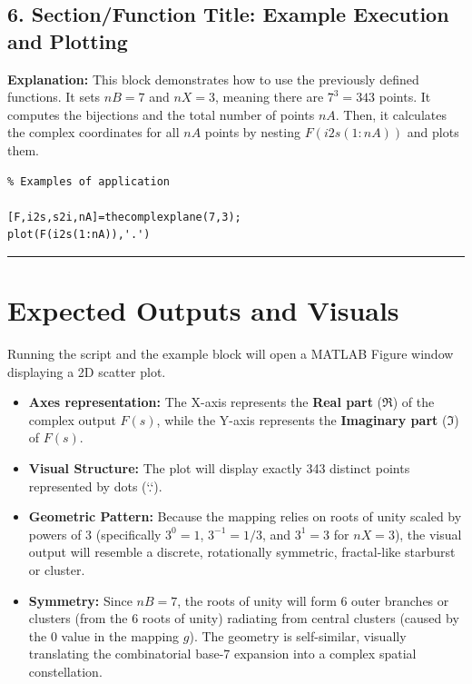 \subsection{6. Section/Function Title: Example Execution and Plotting}
\textbf{Explanation:} This block demonstrates how to use the previously defined functions. It sets $nB = 7$ and $nX = 3$, meaning there are $7^3 = 343$ points. It computes the bijections and the total number of points $nA$. Then, it calculates the complex coordinates for all $nA$ points by nesting $F(i2s(1:nA))$ and plots them.
\begin{lstlisting}
% Examples of application

[F,i2s,s2i,nA]=thecomplexplane(7,3);
plot(F(i2s(1:nA)),'.')
\end{lstlisting}

\vspace{0.5cm}
\hrule
\vspace{0.5cm}

\section{Expected Outputs and Visuals}

Running the script and the example block will open a MATLAB Figure window displaying a 2D scatter plot.

\begin{itemize}
    \item \textbf{Axes representation:} The X-axis represents the \textbf{Real part} ($\Re$) of the complex output $F(s)$, while the Y-axis represents the \textbf{Imaginary part} ($\Im$) of $F(s)$.
    \item \textbf{Visual Structure:} The plot will display exactly 343 distinct points represented by dots (`.`). 
    \item \textbf{Geometric Pattern:} Because the mapping relies on roots of unity scaled by powers of 3 (specifically $3^0=1$, $3^{-1}=1/3$, and $3^1=3$ for $nX=3$), the visual output will resemble a discrete, rotationally symmetric, fractal-like starburst or cluster. 
    \item \textbf{Symmetry:} Since $nB=7$, the roots of unity will form 6 outer branches or clusters (from the 6 roots of unity) radiating from central clusters (caused by the $0$ value in the mapping $g$). The geometry is self-similar, visually translating the combinatorial base-7 expansion into a complex spatial constellation.
\end{itemize}
